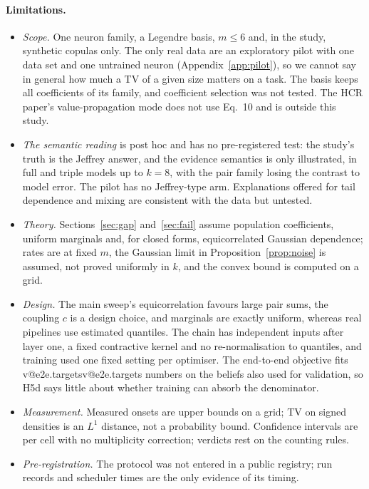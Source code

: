 \documentclass[10pt,a4paper]{article}
\makeatletter
\newcommand{\V}[1]{\ifcsname v@#1\endcsname\csname v@#1\endcsname\else\errmessage{unknown number #1}\fi}
\theoremstyle{upright}
\makeatother
\begin{document}
\paragraph{Limitations.}
\begin{itemize}
\item \emph{Scope.} One neuron family, a Legendre basis, $m\leq6$ and, in the study, synthetic copulas only. The only real data are an exploratory pilot with one data set and one untrained neuron (Appendix~\ref{app:pilot}), so we cannot say in general how much a TV of a given size matters on a task. The basis keeps all coefficients of its family, and coefficient selection was not tested. The HCR paper's value-propagation mode does not use Eq.~10 and is outside this study. %
\item \emph{The semantic reading} is post hoc and has no pre-registered test: the study's truth is the Jeffrey answer, and the evidence semantics is only illustrated, in full and triple models up to $k=8$, with the pair family losing the contrast to model error. The pilot has no Jeffrey-type arm. Explanations offered for tail dependence and mixing are consistent with the data but untested.
\item \emph{Theory.} Sections~\ref{sec:gap} and~\ref{sec:fail} assume population coefficients, uniform marginals and, for closed forms, equicorrelated Gaussian dependence; rates are at fixed $m$, the Gaussian limit in Proposition~\ref{prop:noise} is assumed, not proved uniformly in $k$, and the convex bound is computed on a grid.
\item \emph{Design.} The main sweep's equicorrelation favours large pair sums, the coupling $c$ is a design choice, and marginals are exactly uniform, whereas real pipelines use estimated quantiles. The chain has independent inputs after layer one, a fixed contractive kernel and no re-normalisation to quantiles, and training used one fixed setting per optimiser. The end-to-end objective fits \V{e2e.targets} numbers on the beliefs also used for validation, so H5d says little about whether training can absorb the denominator.
\item \emph{Measurement.} Measured onsets are upper bounds on a grid; TV on signed densities is an $L^1$ distance, not a probability bound. Confidence intervals are per cell with no multiplicity correction; verdicts rest on the counting rules.
\item \emph{Pre-registration.} The protocol was not entered in a public registry; run records and scheduler times are the only evidence of its timing.
\end{itemize}
\end{document}
